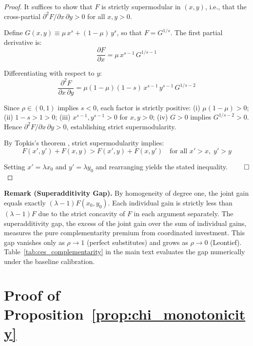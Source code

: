 \documentclass[12pt, a4paper]{article}
\begin{document}
	
	\begin{proof}
		It suffices to show that $F$ is strictly supermodular in $(x, y)$, i.e., that the cross-partial $\partial^2 F / \partial x \, \partial y > 0$ for all $x, y > 0$.
		
		Define $G(x,y) \equiv \mu \, x^s + (1-\mu) \, y^s$, so that $F = G^{1/s}$. The first partial derivative is:
		\begin{equation*}
			\frac{\partial F}{\partial x} = \mu \, x^{s-1} \, G^{1/s - 1}
		\end{equation*}
		
		Differentiating with respect to $y$:
		\begin{equation*}
			\frac{\partial^2 F}{\partial x \, \partial y} = \mu(1-\mu)(1-s) \, x^{s-1} \, y^{s-1} \, G^{1/s - 2}
		\end{equation*}
		
		Since $\rho \in (0,1)$ implies $s < 0$, each factor is strictly positive: (i) $\mu(1-\mu) > 0$; (ii) $1-s > 1 > 0$; (iii) $x^{s-1}, y^{s-1} > 0$ for $x, y > 0$; (iv) $G > 0$ implies $G^{1/s-2} > 0$. Hence $\partial^2 F / \partial x \, \partial y > 0$, establishing strict supermodularity.
		
		By Topkis's theorem \citep{topkis1998}, strict supermodularity implies:
		\begin{equation*}
			F(x', y') + F(x, y) > F(x', y) + F(x, y')
			\quad \text{for all } x' > x,\; y' > y
		\end{equation*}
		
		Setting $x' = \lambda x_0$ and $y' = \lambda y_0$ and rearranging yields the stated inequality. $\qed$
	\end{proof}
	
	\noindent \textbf{Remark (Superadditivity Gap).} By homogeneity of degree one, the joint gain equals exactly $(\lambda - 1) F(x_0, y_0)$. Each individual gain is strictly less than $(\lambda-1) F$ due to the strict concavity of $F$ in each argument separately. The superadditivity gap, the excess of the joint gain over the sum of individual gains, measures the pure complementarity premium from coordinated investment. This gap vanishes only as $\rho \to 1$ (perfect substitutes) and grows as $\rho \to 0$ (Leontief). Table~\ref{tab:ces_complementarity} in the main text evaluates the gap numerically under the baseline calibration.
	
	\section{Proof of Proposition~\ref{prop:chi_monotonicity}} \label{app:proof_chi}
	
\end{document}
